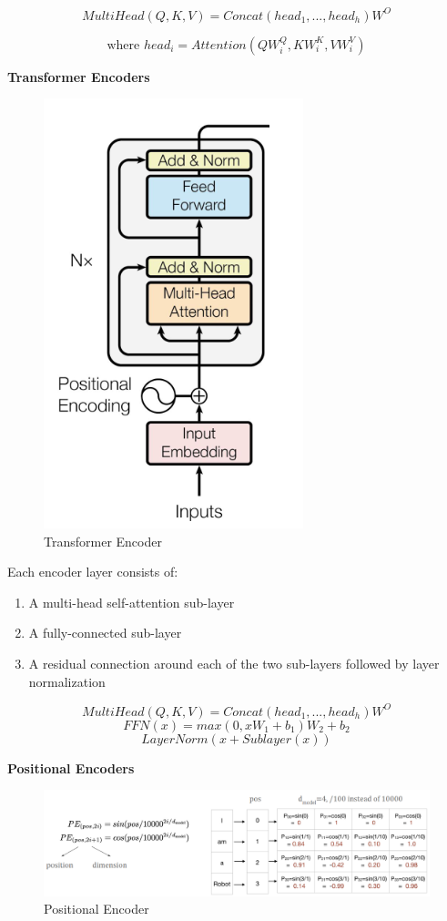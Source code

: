 \[ MultiHead(Q, K, V) = Concat(head_1, ..., head_h)W^O \]

\[\text{where } head_i = Attention(QW_i^Q, KW_i^K, VW_i^V)\]


\noindent
\textbf{Transformer Encoders}

\begin{figure}[h!t]
    \centering
    \includegraphics[width=0.35\linewidth]{transformerencoderr.png}
    \caption{Transformer Encoder}
    \label{fig:enter-label}
\end{figure}

Each encoder layer consists of:
\begin{enumerate}
    \item  A multi-head self-attention sub-layer
    \item A fully-connected sub-layer
    \item A residual connection around each of the two sub-layers followed by layer normalization
\end{enumerate}

\[ MultiHead(Q, K, V) = Concat(head_1, ..., head_h)W^O \]
\[ FFN(x) = max(0, xW_1 + b_1)W_2 + b_2 \]
\[ LayerNorm(x + Sublayer(x))\]

\noindent
\textbf{Positional Encoders}

\begin{figure}[h!t]
    \centering
    \includegraphics[width=1\linewidth]{posenc.png}
    \caption{Positional Encoder}
    \label{fig:enter-label}
\end{figure}

